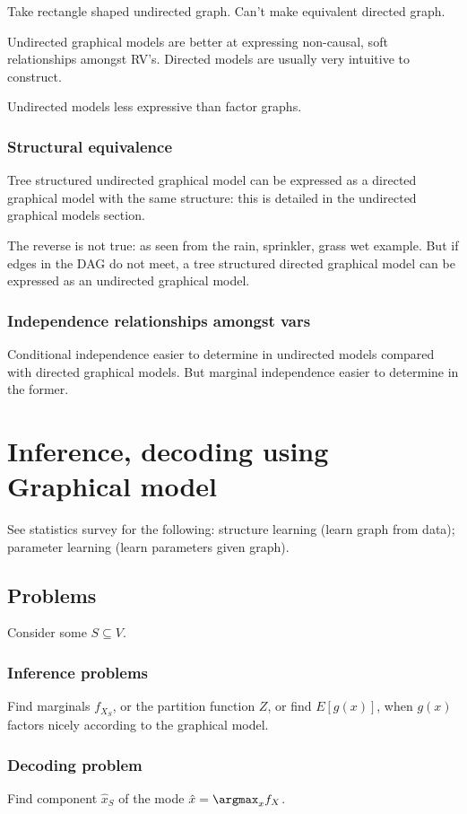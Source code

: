 \documentclass[oneside, article]{memoir}
\begin{document}
Take rectangle shaped undirected graph. Can't make equivalent directed graph.

Undirected graphical models are better at expressing non-causal, soft relationships amongst RV's. Directed models are usually very intuitive to construct.

Undirected models less expressive than factor graphs. \why

\subsubsection{Structural equivalence}
Tree structured undirected graphical model can be expressed as a directed graphical model with the same structure: this is detailed in the undirected graphical models section.

The reverse is not true: as seen from the rain, sprinkler, grass wet example. But if edges in the DAG do not meet, a tree structured directed graphical model can be expressed as an undirected graphical model.


\subsubsection{Independence relationships amongst vars}
Conditional independence easier to determine in undirected models compared with directed graphical models. But marginal independence easier to determine in the former.

\section{Inference, decoding using Graphical model}
See statistics survey for the following: structure learning (learn graph from data); parameter learning (learn parameters given graph).

\subsection{Problems}
Consider some $S \subseteq V$.

\subsubsection{Inference problems}
Find marginals $f_{X_S}$, or the partition function $Z$, or find $E[g(x)]$, when $g(x)$ factors nicely according to the graphical model.

\subsubsection{Decoding problem}
Find component $\hat{x}_S$ of the mode $\hat{x} = \argmax_x f_X$.
\end{document}
